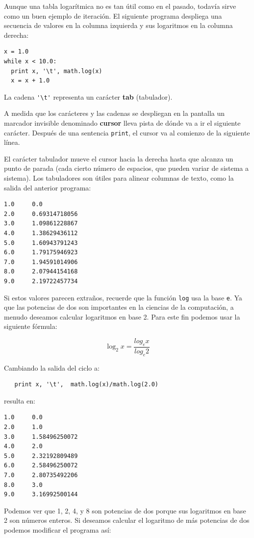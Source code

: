 
Aunque una tabla logarítmica no es tan útil como en el pasado, todavía
sirve como un buen ejemplo de iteración. El siguiente programa
despliega una secuencia de valores en la columna izquierda y sus
logaritmos en la columna derecha:

\beforeverb
\begin{verbatim}
x = 1.0
while x < 10.0:
  print x, '\t', math.log(x)
  x = x + 1.0
\end{verbatim}
\afterverb
%
La cadena
\verb+'\t'+ representa un carácter {\bf tab} (tabulador).

A medida que los carácteres y las cadenas se despliegan en 
la pantalla un marcador invisible denominado  {\bf cursor} 
lleva pista de dónde va a ir el siguiente carácter.  Después
de una sentencia \texttt{print}, el cursor va al comienzo de la
siguiente línea.

El carácter tabulador mueve el cursor hacia la derecha hasta que 
alcanza un punto de parada (cada cierto número de espacios, que
pueden variar de sistema a sistema). Los tabuladores son útiles
para alinear columnas de texto, como la salida del anterior
programa:

\beforeverb
\begin{verbatim}
1.0     0.0
2.0     0.69314718056
3.0     1.09861228867
4.0     1.38629436112
5.0     1.60943791243
6.0     1.79175946923
7.0     1.94591014906
8.0     2.07944154168
9.0     2.19722457734
\end{verbatim}
\afterverb
%
Si estos valores parecen extraños, recuerde que la función  \texttt{log} usa
la base \texttt{e}. Ya que las potencias de dos son importantes en la 
ciencias de la computación, a menudo deseamos calcular logaritmos en
base 2.  Para este fin podemos usar la siguiente fórmula:

\begin{equation}
\log_2 x = \frac {log_e x}{log_e 2}
\end{equation}

Cambiando la salida del ciclo a:

\beforeverb
\begin{verbatim}
   print x, '\t',  math.log(x)/math.log(2.0)
\end{verbatim}
\afterverb
%
resulta en:

\beforeverb
\begin{verbatim}
1.0     0.0
2.0     1.0
3.0     1.58496250072
4.0     2.0
5.0     2.32192809489
6.0     2.58496250072
7.0     2.80735492206
8.0     3.0
9.0     3.16992500144
\end{verbatim}
\afterverb
%
Podemos ver que  1, 2, 4, y 8 son potencias de dos porque sus
logaritmos en base 2 son números enteros. Si deseamos 
calcular el logaritmo de más potencias de dos podemos
modificar el programa así:


